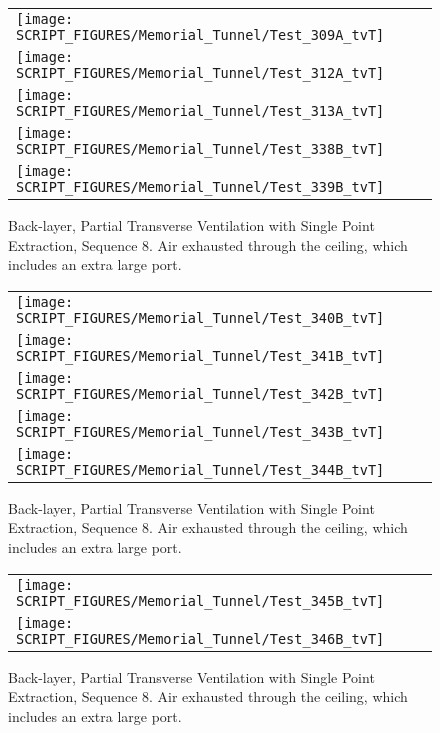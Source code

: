 \begin{figure}[p]
\begin{tabular*}{\textwidth}{l}
\texttt{[image: SCRIPT\_FIGURES/Memorial\_Tunnel/Test\_309A\_tvT]} \\
\texttt{[image: SCRIPT\_FIGURES/Memorial\_Tunnel/Test\_312A\_tvT]} \\
\texttt{[image: SCRIPT\_FIGURES/Memorial\_Tunnel/Test\_313A\_tvT]} \\
\texttt{[image: SCRIPT\_FIGURES/Memorial\_Tunnel/Test\_338B\_tvT]} \\
\texttt{[image: SCRIPT\_FIGURES/Memorial\_Tunnel/Test\_339B\_tvT]}
\end{tabular*}
\caption[Back-layer, Partial Transverse Ventilation with Single Point Extraction, Sequence 8]{Back-layer, Partial Transverse Ventilation with Single Point Extraction, Sequence 8. Air exhausted through the ceiling, which includes an extra large port.}
\label{Memorial_Tunnel_Seq_8b}
\end{figure}

\begin{figure}[p]
\begin{tabular*}{\textwidth}{l}
\texttt{[image: SCRIPT\_FIGURES/Memorial\_Tunnel/Test\_340B\_tvT]} \\
\texttt{[image: SCRIPT\_FIGURES/Memorial\_Tunnel/Test\_341B\_tvT]} \\
\texttt{[image: SCRIPT\_FIGURES/Memorial\_Tunnel/Test\_342B\_tvT]} \\
\texttt{[image: SCRIPT\_FIGURES/Memorial\_Tunnel/Test\_343B\_tvT]} \\
\texttt{[image: SCRIPT\_FIGURES/Memorial\_Tunnel/Test\_344B\_tvT]}
\end{tabular*}
\caption[Back-layer, Partial Transverse Ventilation with Single Point Extraction, Sequence 8]{Back-layer, Partial Transverse Ventilation with Single Point Extraction, Sequence 8. Air exhausted through the ceiling, which includes an extra large port.}
\label{Memorial_Tunnel_Seq_8c}
\end{figure}

\begin{figure}[p]
\begin{tabular*}{\textwidth}{l}
\texttt{[image: SCRIPT\_FIGURES/Memorial\_Tunnel/Test\_345B\_tvT]} \\
\texttt{[image: SCRIPT\_FIGURES/Memorial\_Tunnel/Test\_346B\_tvT]}
\end{tabular*}
\caption[Back-layer, Partial Transverse Ventilation with Single Point Extraction, Sequence 8]{Back-layer, Partial Transverse Ventilation with Single Point Extraction, Sequence 8. Air exhausted through the ceiling, which includes an extra large port.}
\label{Memorial_Tunnel_Seq_8d}
\end{figure}

